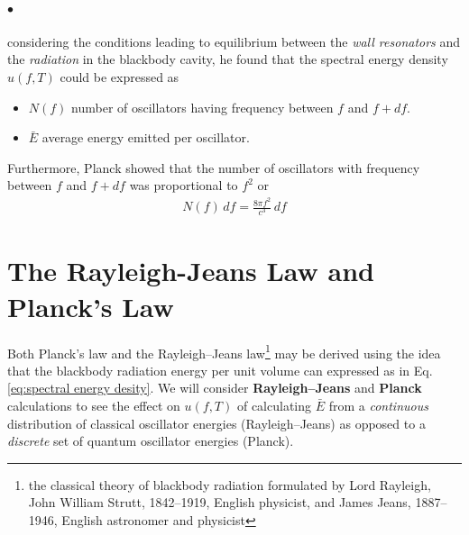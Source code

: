     \paragraph{$\bullet$}  considering the conditions leading to equilibrium between the \textit{wall resonators}
    and the \textit{radiation} in the blackbody cavity, he found that the 
    spectral energy density $u(f, T)$ could be expressed as
    {\tiny \begin{itemize}
        \item $N(f)$ number of oscillators having frequency between $f$ and $f + df$.
        \item $\bar{E}$ average energy emitted per oscillator.
    \end{itemize}}

    Furthermore, Planck showed that the number of oscillators with frequency
    between $f$ and $f + df$ was proportional to $f^2$ or 
    \begin{align}
        \label{eq:number of oscillator}
        N(f)\, df = \frac{8 \pi f^2}{c^3} \, df
    \end{align}

\section{The Rayleigh-Jeans Law and Planck's Law}
    Both Planck’s law and the Rayleigh–Jeans law\footnote{the classical theory of blackbody radiation formulated by 
    Lord Rayleigh, John William Strutt, 1842–1919, English physicist, and James Jeans, 1887–1946, English 
    astronomer and physicist} may be derived using the idea that the blackbody radiation energy per unit volume can expressed
    as in Eq.\eqref{eq:spectral energy desity}. We will consider \textbf{Rayleigh–Jeans} and \textbf{Planck} calculations 
    to see the effect on $u(f, T)$ of calculating $\bar{E}$ from a \textit{continuous} distribution of classical oscillator energies 
    (Rayleigh–Jeans) as opposed to a \textit{discrete} set of quantum oscillator energies (Planck).

